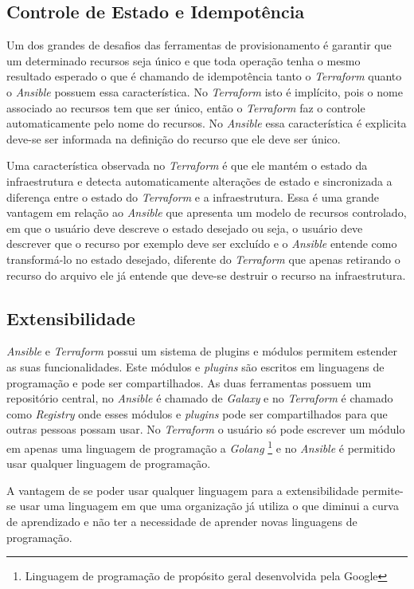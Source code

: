 \subsection{Controle de Estado e Idempotência} \label{idem}
Um dos grandes de desafios das ferramentas de provisionamento é garantir que um determinado recursos seja único e que toda operação tenha o mesmo resultado esperado o que é chamando de idempotência tanto o  \textit{Terraform} quanto o \textit{Ansible} possuem essa característica. No \textit{Terraform} isto é implícito, pois o nome associado ao recursos tem que ser único, então o \textit{Terraform} faz o controle automaticamente pelo nome do recursos. No \textit{Ansible} essa característica é explicita deve-se ser informada na definição do recurso que ele deve ser único.

Uma característica observada no \textit{Terraform} é que ele mantém o estado da infraestrutura e detecta automaticamente alterações de estado e sincronizada a diferença entre o estado do \textit{Terraform} e a infraestrutura. Essa é uma grande vantagem em relação ao \textit{Ansible} que apresenta um modelo de recursos controlado, em que o usuário deve descreve o estado desejado ou seja, o usuário deve descrever que o recurso por exemplo deve ser excluído e o \textit{Ansible} entende como transformá-lo no estado desejado, diferente do \textit{Terraform} que apenas retirando o recurso do arquivo ele já entende que deve-se destruir o recurso na infraestrutura.

\subsection{Extensibilidade}

\textit{Ansible} e \textit{Terraform} possui um sistema de plugins e módulos permitem estender as suas funcionalidades. Este módulos e \textit{plugins} são escritos em linguagens de programação e pode ser compartilhados. As duas ferramentas possuem um repositório central, no \textit{Ansible} é chamado de \textit{Galaxy} e no \textit{Terraform} é chamado como \textit{Registry} onde esses módulos e \textit{plugins} pode ser compartilhados para que outras pessoas possam usar. No \textit{Terraform} o usuário só pode escrever um módulo em apenas uma linguagem de programação a \textit{Golang}  \footnote{Linguagem de programação de propósito geral desenvolvida pela Google} e no \textit{Ansible} é permitido usar qualquer linguagem de programação.  

A vantagem de se poder usar qualquer linguagem para a extensibilidade permite-se usar uma linguagem em que uma organização já utiliza o que diminui a curva de aprendizado e não ter a necessidade de aprender novas linguagens de programação.  

